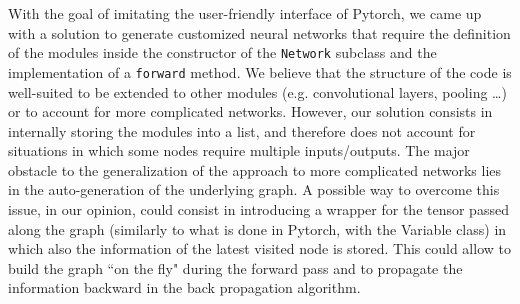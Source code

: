 \documentclass[10pt,final,a4paper]{article}
\begin{document}
With the goal of imitating the user-friendly interface of Pytorch, we came up with a solution to generate customized neural networks that require the definition of the modules inside the constructor of the \verb|Network| subclass and the implementation of a \verb|forward| method. We believe that the structure of the code is well-suited to be extended to other modules (e.g. convolutional layers, pooling \ldots) or to account for more complicated networks. However, our solution consists in internally storing the modules into a list, and therefore does not account for situations in which some nodes require multiple inputs/outputs. The major obstacle to the generalization of the approach to more complicated networks lies in the auto-generation of the underlying graph. A possible way to overcome this issue, in our opinion, could consist in introducing a wrapper for the tensor passed along the graph (similarly to what is done in Pytorch, with the Variable class) in which also the information of the latest visited node is stored. This could allow to build the graph ``on the fly" during the forward pass and to propagate the information backward in the back propagation algorithm.


 
\end{document}
